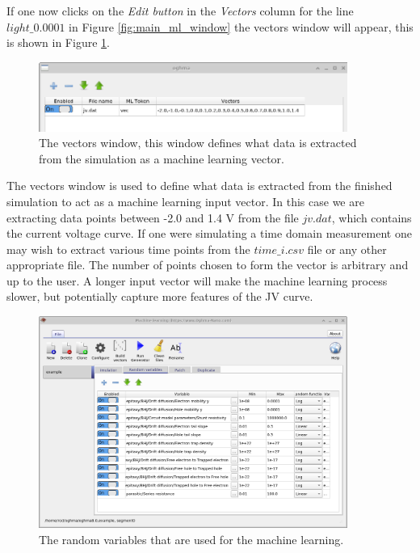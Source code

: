 If one now clicks on the \emph{Edit button} in the \emph{Vectors} column for the line $light\_0.0001$ in Figure \ref{fig:main_ml_window} the vectors window will appear, this is shown in Figure \ref{fig:ml_vectors}.

\begin{figure}
\centering
\includegraphics[width=0.9\textwidth,height=0.25\textwidth]{./images/ml/vectors.png}
\caption{The vectors window, this window defines what data is extracted from the simulation as a machine learning vector.}
\label{fig:ml_vectors}
\end{figure}

The vectors window is used to define what data is extracted from the finished simulation to act as a machine learning input vector. In this case we are extracting data points between -2.0 and 1.4 V from the file $jv.dat$, which contains the current voltage curve. If one were simulating a time domain measurement one may wish to extract various time points from the $time\_i.csv$ file or any other appropriate file. The number of points chosen to form the vector is arbitrary and up to the user. A longer input vector will make the machine learning process slower, but potentially capture more features of the JV curve.

\begin{figure}
\centering
\includegraphics[width=0.9\textwidth,height=0.7\textwidth]{./images/ml/random_vars.png}
\caption{The random variables that are used for the machine learning.}
\label{fig:ml_random_vars}
\end{figure}

